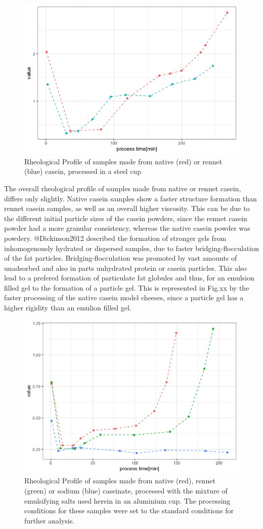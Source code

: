 \documentclass[
]{article}
\begin{document}
\begin{figure}
\includegraphics[width=0.75\linewidth]{plots/1.4_steel.alu.sum} \caption{Rheological Profile of samples made from native (red) or rennet (blue) casein, processed in a steel cup}\label{fig:unnamed-chunk-7}
\end{figure}

The overall rheological profile of samples made from native or rennet
casein, differs only slightly. Native casein samples show a faster
structure formation than rennet casein samples, as well as an overall
higher viscosity. This can be due to the different initial particle
sizes of the casein powders, since the rennet casein powder had a more
granular consistency, whereas the native casein powder was powdery.
@Dickinson2012 described the formation of stronger gels from
inhomogenously hydrated or dispersed samples, due to faster
bridging-flocculation of the fat particles. Bridging-flocculation was
promoted by vast amounts of unadsorbed and also in parts unhydrated
protein or casein particles. This also lead to a prefered formation of
particulate fat globules and thus, for an emulsion filled gel to the
formation of a particle gel. This is represented in Fig.xx by the faster
processing of the native casein model cheeses, since a particle gel has
a higher rigidity than an emulion filled gel.

\begin{figure}
\includegraphics[width=0.75\linewidth]{plots/1.5_source.vari} \caption[Overview of viscosity, depending on the protein source]{Rheological Profile of samples made from native (red), rennet (green) or sodium (blue) caseinate,  processed with the mixture of emulsifying salts used herein in an aluminium cup. The processing conditions for these samples were set to the standard conditions for further analysis.}\label{fig:unnamed-chunk-8}
\end{figure}
\end{document}
